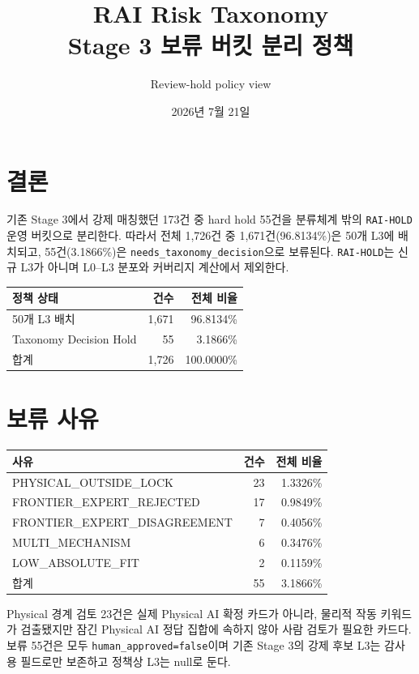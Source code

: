 \documentclass[11pt,a4paper]{article}
\title{\sffamily\bfseries RAI Risk Taxonomy\\Stage 3 보류 버킷 분리 정책}
\author{Review-hold policy view}
\date{2026년 7월 21일}
\newcommand{\code}[1]{\texttt{#1}}
\begin{document}
\maketitle

\section*{결론}

기존 Stage 3에서 강제 매칭했던 173건 중 hard hold 55건을 분류체계 밖의
\code{RAI-HOLD} 운영 버킷으로 분리한다. 따라서 전체 1,726건 중
1,671건(96.8134\%)은 50개 L3에 배치되고, 55건(3.1866\%)은
\code{needs\_taxonomy\_decision}으로 보류된다. \code{RAI-HOLD}는 신규 L3가
아니며 L0--L3 분포와 커버리지 계산에서 제외한다.

\begin{table}[h]
\centering
\begin{tabular}{lrr}
\toprule
정책 상태 & 건수 & 전체 비율 \\
\midrule
50개 L3 배치 & 1,671 & 96.8134\% \\
Taxonomy Decision Hold & 55 & 3.1866\% \\
\midrule
합계 & 1,726 & 100.0000\% \\
\bottomrule
\end{tabular}
\end{table}

\section{보류 사유}

\begin{longtable}{lrr}
\toprule
사유 & 건수 & 전체 비율 \\
\midrule
\endhead
PHYSICAL\_OUTSIDE\_LOCK & 23 & 1.3326\% \\
FRONTIER\_EXPERT\_REJECTED & 17 & 0.9849\% \\
FRONTIER\_EXPERT\_DISAGREEMENT & 7 & 0.4056\% \\
MULTI\_MECHANISM & 6 & 0.3476\% \\
LOW\_ABSOLUTE\_FIT & 2 & 0.1159\% \\
\midrule
합계 & 55 & 3.1866\% \\
\bottomrule
\end{longtable}

Physical 경계 검토 23건은 실제 Physical AI 확정 카드가 아니라, 물리적 작동
키워드가 검출됐지만 잠긴 Physical AI 정답 집합에 속하지 않아 사람 검토가 필요한
카드다. 보류 55건은 모두 \code{human\_approved=false}이며 기존 Stage 3의
강제 후보 L3는 감사용 필드로만 보존하고 정책상 L3는 null로 둔다.
\end{document}

